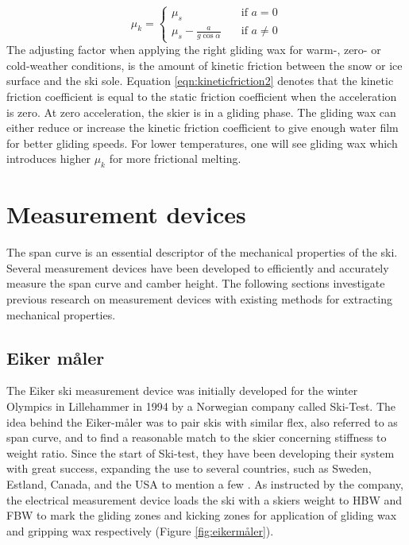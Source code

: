 \begin{equation}\label{eqn:kineticfriction2}
    \mu_k = 
    \begin{cases}
    \mu_s       & \quad \text{if } a = 0\\
    \mu_s - \frac{a}{g\cos\alpha}  & \quad \text{if } a \neq 0
    \end{cases}
\end{equation}
\newline
The adjusting factor when applying the right gliding wax for warm-, zero- or cold-weather conditions, is the amount of kinetic friction between the snow or ice surface and the ski sole. Equation \ref{eqn:kineticfriction2} denotes that the kinetic friction coefficient is equal to the static friction coefficient when the acceleration is zero. At zero acceleration, the skier is in a gliding phase. The gliding wax can either reduce or increase the kinetic friction coefficient to give enough water film for better gliding speeds. For lower temperatures, one will see gliding wax which introduces higher $\mu_k$ for more frictional melting.

\section{Measurement devices}
\label{sec:measurementdevices}
The span curve is an essential descriptor of the mechanical properties of the ski. Several measurement devices have been developed to efficiently and accurately measure the span curve and camber height. The following sections investigate previous research on measurement devices with existing methods for extracting mechanical properties.

\subsection{Eiker måler}
\label{subsec:eiker}
The Eiker ski measurement device was initially developed for the winter Olympics in Lillehammer in 1994 by a Norwegian company called Ski-Test. The idea behind the Eiker-måler was to pair skis with similar flex, also referred to as span curve, and to find a reasonable match to the skier concerning stiffness to weight ratio. Since the start of Ski-test, they have been developing their system with great success, expanding the use to several countries, such as Sweden, Estland, Canada, and the USA to mention a few \citep{eiker_2018}. As instructed by the company, the electrical measurement device loads the ski with a skiers weight to HBW and FBW to mark the gliding zones and kicking zones for application of gliding wax and gripping wax respectively (Figure \ref{fig:eikermåler}).

